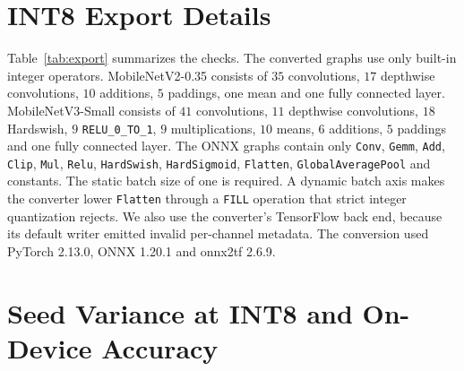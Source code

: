\begin{table}[t]
  \centering
  \caption{Variants of \Pqk on TrashNet/MobileNetV3-Small: test and validation macro-F1 at seed~0 for every variant, and the three-seed test macro-F1 where three seeds exist. Reference methods are shown for comparison.}
  \label{tab:screens}
\end{table}

\section{INT8 Export Details}
\label{app:export}

\begin{table}[t]
  \centering
  \caption{Checks on the exported models, by pair. Conv ops counts convolutions including depthwise ones. ONNX--PyTorch parity is the largest absolute logit difference over the pair's models; ``fp32 reload exact'' counts models whose reloaded fp32 weights reproduce the recorded test score. The last column is the mean change in test macro-F1 from fp32 to INT8, with its standard deviation over models.}
  \label{tab:export}
\end{table}

Table~\ref{tab:export} summarizes the checks.
The converted graphs use only built-in integer operators.
MobileNetV2-0.35 consists of $35$ convolutions, $17$ depthwise convolutions, $10$ additions, $5$ paddings, one mean and one fully connected layer. MobileNetV3-Small consists of $41$ convolutions, $11$ depthwise convolutions, $18$ Hardswish, $9$ \texttt{RELU\_0\_TO\_1}, $9$ multiplications, $10$ means, $6$ additions, $5$ paddings and one fully connected layer.
The ONNX graphs contain only \texttt{Conv}, \texttt{Gemm}, \texttt{Add}, \texttt{Clip}, \texttt{Mul}, \texttt{Relu}, \texttt{HardSwish}, \texttt{HardSigmoid}, \texttt{Flatten}, \texttt{GlobalAveragePool} and constants.
The static batch size of one is required. A dynamic batch axis makes the converter lower \texttt{Flatten} through a \texttt{FILL} operation that strict integer quantization rejects.
We also use the converter's TensorFlow back end, because its default writer emitted invalid per-channel metadata.
The conversion used PyTorch 2.13.0, ONNX 1.20.1 and onnx2tf 2.6.9.

\section{Seed Variance at INT8 and On-Device Accuracy}
\label{app:int8}

